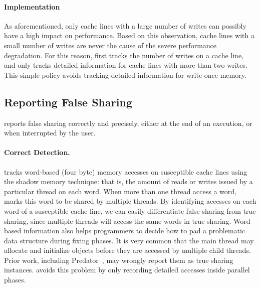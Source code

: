 
\paragraph{Implementation} 
As aforementioned, only cache lines with a large number of writes can possibly have a high impact on performance. Based on this observation, cache lines with a small number of writes are never the cause of the severe performance degradation. For this reason, \Cheetah{} first tracks the number of writes on a cache line, and only tracks detailed information for cache lines with more than two writes. This simple policy avoids tracking detailed information for write-once memory. 

 \subsection{Reporting False Sharing}
\label{sec:report}

\Cheetah{} reports false sharing correctly and precisely, either at the end of an execution, or when interrupted by the user.  

\paragraph{Correct Detection.} \Cheetah{} tracks word-based (four byte) memory accesses on susceptible cache lines using the shadow memory technique: that is, the amount of reads or writes issued by a particular thread on each word. When more than one thread access a word, \Cheetah{} marks this word to be shared by multiple threads. By identifying accesses on each word of a susceptible cache line, we can easily differentiate false sharing from true sharing, since multiple threads will access the same words in true sharing. Word-based information also helps programmers to decide how to pad a problematic data structure during fixing phases. It is very common that the main thread may allocate and initialize objects before they are accessed by multiple child threads. Prior work, including Predator~\cite{Predator}, may wrongly report them as true sharing instances. \cheetah{} avoids this problem by only recording detailed accesses inside parallel phases.

